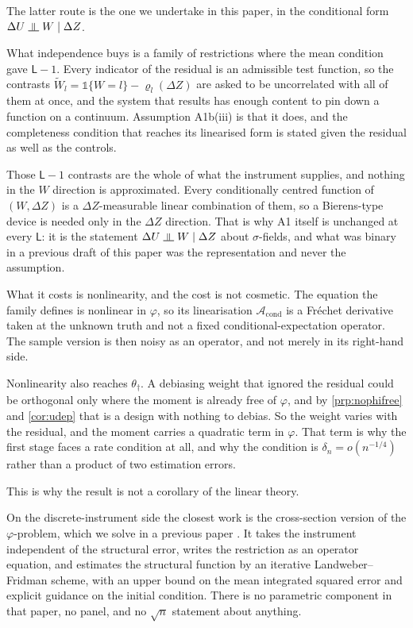 \documentclass[
  12pt]{article}
\newcommand{\1}[1]{\mathds{1}\left[#1\right]}
\theoremstyle{plain}
\theoremstyle{definition}
\theoremstyle{definition}
\theoremstyle{remark}
\newcommand{\un}{\mathds{1}}
\newcommand{\upmodels}{\mathrel{\rotatebox[origin=c]{90}{$\models$}}}
\begin{document}
The latter route is the one we undertake in this paper, in the
conditional form \(\Delta U\upmodels W\mid\Delta Z\).

What independence buys is a family of restrictions where the mean
condition gave \(\mathsf L-1\). Every indicator of the residual is an
admissible test function, so the contrasts
\(\widetilde W_l=\un\{W=l\}-\varrho_l(\Delta Z)\) are asked to be
uncorrelated with all of them at once, and the system that results has
enough content to pin down a function on a continuum. Assumption
A1b(iii) is that it does, and the completeness condition that reaches
its linearised form is stated given the residual as well as the
controls.

Those \(\mathsf L-1\) contrasts are the whole of what the instrument
supplies, and nothing in the \(W\) direction is approximated. Every
conditionally centred function of \((W,\Delta Z)\) is a
\(\Delta Z\)-measurable linear combination of them, so a Bierens-type
device is needed only in the \(\Delta Z\) direction. That is why A1
itself is unchanged at every \(\mathsf L\): it is the statement
\(\Delta U\upmodels W\mid\Delta Z\) about \(\sigma\)-fields, and what
was binary in a previous draft of this paper was the representation and
never the assumption.

What it costs is nonlinearity, and the cost is not cosmetic. The
equation the family defines is nonlinear in \(\varphi\), so its
linearisation \(\mathcal A_{\mathrm{cond}}\) is a Fréchet derivative
taken at the unknown truth and not a fixed conditional-expectation
operator. The sample version is then noisy as an operator, and not
merely in its right-hand side.

Nonlinearity also reaches \(\theta_\dagger\). A debiasing weight that
ignored the residual could be orthogonal only where the moment is
already free of \(\varphi\), and by \cref{prp:nophifree} and
\cref{cor:udep} that is a design with nothing to debias. So the weight
varies with the residual, and the moment carries a quadratic term in
\(\varphi\). That term is why the first stage faces a rate condition at
all, and why the condition is \(\delta_n=o(n^{-1/4})\) rather than a
product of two estimation errors.

This is why the result is not a corollary of the linear theory.

On the discrete-instrument side the closest work is the cross-section
version of the \(\varphi\)-problem, which we solve in a previous paper
\citep{centorrinofeveflorens2019}. It takes the instrument independent
of the structural error, writes the restriction as an operator equation,
and estimates the structural function by an iterative Landweber--Fridman
scheme, with an upper bound on the mean integrated squared error and
explicit guidance on the initial condition. There is no parametric
component in that paper, no panel, and no \(\sqrt n\) statement about
anything.
\end{document}
